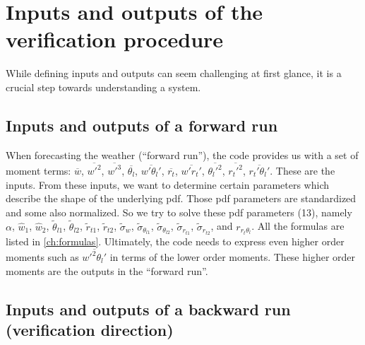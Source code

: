 \section{Inputs and outputs of the verification procedure}\label{sec:inputsandoutputs}

While defining inputs and outputs can seem challenging at first glance,
it is a crucial step towards understanding a system.

\subsection{Inputs and outputs of a forward run}
\label{subsec:inputs-and-outputs-of-a-forward-run}

When forecasting the weather (\enquote{forward run}),
the code provides us with a set of moment terms:
$\overline{w}$, $\overline{w'^2}$, $\overline{w'^3}$, $\overline{\theta_l}$, $\overline{w'\theta_l'}$,
$\overline{r_t}$, $\overline{w' r_t'}$, $\overline{\theta_l'^2}$, $\overline{r_t'^2}$, $\overline{r_t'\theta_l'}$.
These are the inputs.
From these inputs,
we want to determine certain parameters which describe the shape of the underlying \gls{pdf}.
Those \gls{pdf} parameters are standardized and some also normalized.
So we try to solve these \gls{pdf} parameters (13),
namely $\alpha$, $\widehat{w}_1$, $\widehat{w}_2$, $\tilde{\theta}_{l1}$, $\tilde{\theta}_{l2}$, $\tilde{r}_{t1}$,
$\tilde{r}_{t2}$, $\tilde{\sigma}_w$, $\tilde{\sigma}_{\theta_{l1}}$, $\tilde{\sigma}_{\theta_{l2}}$,
$\tilde{\sigma}_{r_{t1}}$, $\tilde{\sigma}_{r_{t2}}$, and $r_{r_t \theta_l}$.
All the formulas are listed in \cref{ch:formulas}.
Ultimately, the code needs to express even higher order moments such as $\overline{w'^2 \theta_l'}$
in terms of the lower order moments.
These higher order moments are the outputs in the \enquote{forward run}.

\subsection{Inputs and outputs of a backward run (verification direction)}
\label{subsec:inputs-and-outputs-of-a-backward-run-(verification-direction)}

